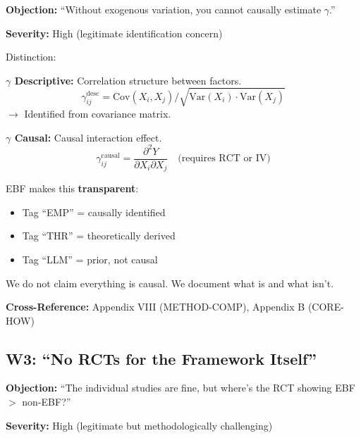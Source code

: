\begin{tcolorbox}[colback=gray!5!white, colframe=gray!75!black]
\textbf{Objection:} ``Without exogenous variation, you cannot causally estimate $\gamma$.''

\textbf{Severity:} High (legitimate identification concern)
\end{tcolorbox}

\begin{axiom}
Distinction:

\textbf{$\gamma$ Descriptive:} Correlation structure between factors.
\begin{equation}
\gamma_{ij}^{\text{desc}} = \text{Cov}(X_i, X_j) / \sqrt{\text{Var}(X_i) \cdot \text{Var}(X_j)}
\end{equation}
$\rightarrow$ Identified from covariance matrix.

\textbf{$\gamma$ Causal:} Causal interaction effect.
\begin{equation}
\gamma_{ij}^{\text{causal}} = \frac{\partial^2 Y}{\partial X_i \partial X_j} \quad \text{(requires RCT or IV)}
\end{equation}

EBF makes this \textbf{transparent}:
\begin{itemize}[nosep]
    \item Tag ``EMP'' = causally identified
    \item Tag ``THR'' = theoretically derived
    \item Tag ``LLM'' = prior, not causal
\end{itemize}

We do not claim everything is causal. We document what is and what isn't.
\end{axiom}

\textbf{Cross-Reference:} Appendix VIII (METHOD-COMP), Appendix B (CORE-HOW)

\subsection{W3: ``No RCTs for the Framework Itself''}
\label{sec:da-w3}

\begin{tcolorbox}[colback=gray!5!white, colframe=gray!75!black]
\textbf{Objection:} ``The individual studies are fine, but where's the RCT showing EBF $>$ non-EBF?''

\textbf{Severity:} High (legitimate but methodologically challenging)
\end{tcolorbox}

